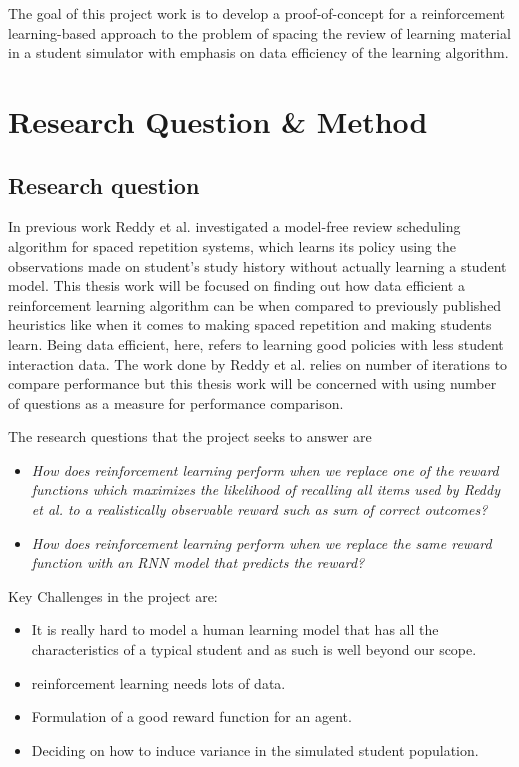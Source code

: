 \documentclass[12pt]{article}
\begin{document}
The goal of this project work is to develop a proof-of-concept for a reinforcement learning-based approach to the problem of spacing the review of learning material in a student simulator with emphasis on data efficiency of the learning algorithm.


\section{Research Question \& Method}
\subsection{Research question}
In previous work Reddy et al. \cite{reddy} investigated a model-free review scheduling algorithm for spaced repetition systems{\color{blue},} which learns its policy using the observations made on student’s study history without actually learning a student model. This thesis work will be focused on finding out how data efficient a reinforcement learning algorithm can be when compared to previously published heuristics like \cite{leitner} when it comes to making spaced repetition and making students learn. {\color{blue}Being data efficient, here, refers to learning good policies with less student interaction data}. The work done by Reddy et al. \cite{reddy} relies on number of iterations to compare performance but this thesis work will be concerned with using number of questions as a measure for performance comparison. \\

{\color{blue}
The research questions that the project seeks to answer are\\

\begin{itemize}
\item
\textit{How does reinforcement learning perform when we replace one of the reward functions which maximizes the likelihood of recalling all items used by Reddy et al. \cite{reddy} to a realistically observable reward such as sum of correct outcomes?}
\item
\textit{How does reinforcement learning perform when we replace the same reward function with an RNN model that predicts the reward?}
\end{itemize}
}
{\color{blue}Key Challenges in the project are:}
\begin{itemize}
    \item It is really hard to model a human learning model that has all the characteristics of a typical student and as such is well beyond our scope.
    \item reinforcement learning needs lots of data.
    \item Formulation of a good reward function for an agent.
    \item Deciding on how to induce variance in the simulated student population.
\end{itemize}
\end{document}
